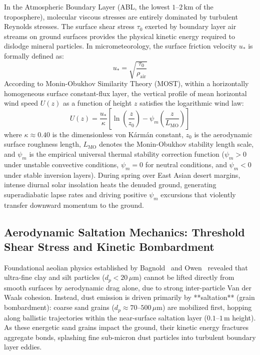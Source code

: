 In the Atmospheric Boundary Layer (ABL, the lowest $1\text{--}2\,\text{km}$ of the troposphere), molecular viscous stresses are entirely dominated by turbulent Reynolds stresses. The surface shear stress $\tau_0$ exerted by boundary layer air streams on ground surfaces provides the physical kinetic energy required to dislodge mineral particles. In micrometeorology, the surface friction velocity $u_*$ is formally defined as:
\begin{equation}
\label{eq:friction_velocity_def}
u_* = \sqrt{\frac{\tau_0}{\rho_{\text{air}}}}
\end{equation}
According to Monin-Obukhov Similarity Theory (MOST), within a horizontally homogeneous surface constant-flux layer, the vertical profile of mean horizontal wind speed $U(z)$ as a function of height $z$ satisfies the logarithmic wind law:
\begin{equation}
\label{eq:monin_obukhov}
U(z) = \frac{u_*}{\kappa} \left[ \ln\left(\frac{z}{z_0}\right) - \psi_m\left(\frac{z}{L_{\text{MO}}}\right) \right]
\end{equation}
where $\kappa \approx 0.40$ is the dimensionless von K\'arm\'an constant, $z_0$ is the aerodynamic surface roughness length, $L_{\text{MO}}$ denotes the Monin-Obukhov stability length scale, and $\psi_m$ is the empirical universal thermal stability correction function ($\psi_m > 0$ under unstable convective conditions, $\psi_m = 0$ for neutral conditions, and $\psi_m < 0$ under stable inversion layers). During spring over East Asian desert margins, intense diurnal solar insolation heats the denuded ground, generating superadiabatic lapse rates and driving positive $\psi_m$ excursions that violently transfer downward momentum to the ground.

\subsection{Aerodynamic Saltation Mechanics: Threshold Shear Stress and Kinetic Bombardment}
\label{subsec:saltation_mechanics}

Foundational aeolian physics established by Bagnold~\cite{bagnold1941physics} and Owen~\cite{owen1964saltation} revealed that ultra-fine clay and silt particles ($d_p < 20\,\mu\text{m}$) cannot be lifted directly from smooth surfaces by aerodynamic drag alone, due to strong inter-particle Van der Waals cohesion. Instead, dust emission is driven primarily by **saltation** (grain bombardment): coarse sand grains ($d_p \approx 70\text{--}500\,\mu\text{m}$) are mobilized first, hopping along ballistic trajectories within the near-surface saltation layer ($0.1\text{--}1\,\text{m}$ height). As these energetic sand grains impact the ground, their kinetic energy fractures aggregate bonds, splashing fine sub-micron dust particles into turbulent boundary layer eddies.


